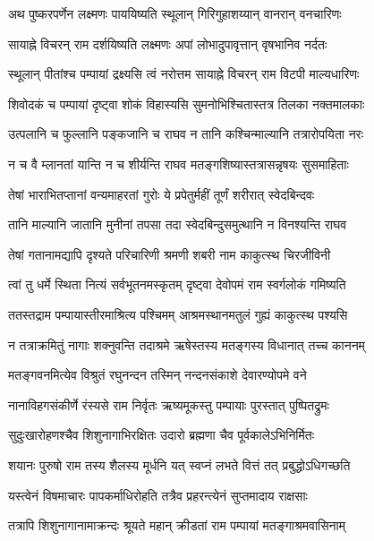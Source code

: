 \twolineshloka
{अथ पुष्करपर्णेन लक्ष्मणः पाययिष्यति}
{स्थूलान् गिरिगुहाशय्यान् वानरान् वनचारिणः} %

\twolineshloka
{सायाह्ने विचरन् राम दर्शयिष्यति लक्ष्मणः}
{अपां लोभादुपावृत्तान् वृषभानिव नर्दतः} %

\twolineshloka
{स्थूलान् पीतांश्च पम्पायां द्रक्ष्यसि त्वं नरोत्तम}
{सायाह्ने विचरन् राम विटपी माल्यधारिणः} %

\twolineshloka
{शिवोदकं च पम्पायां दृष्ट्वा शोकं विहास्यसि}
{सुमनोभिश्चितास्तत्र तिलका नक्तमालकाः} %

\twolineshloka
{उत्पलानि च फुल्लानि पङ्कजानि च राघव}
{न तानि कश्चिन्माल्यानि तत्रारोपयिता नरः} %

\twolineshloka
{न च वै म्लानतां यान्ति न च शीर्यन्ति राघव}
{मतङ्गशिष्यास्तत्रासन्नृषयः सुसमाहिताः} %

\twolineshloka
{तेषां भाराभितप्तानां वन्यमाहरतां गुरोः}
{ये प्रपेतुर्महीं तूर्णं शरीरात् स्वेदबिन्दवः} %

\twolineshloka
{तानि माल्यानि जातानि मुनीनां तपसा तदा}
{स्वेदबिन्दुसमुत्थानि न विनश्यन्ति राघव} %

\twolineshloka
{तेषां गतानामद्यापि दृश्यते परिचारिणी}
{श्रमणी शबरी नाम काकुत्स्थ चिरजीविनी} %

\twolineshloka
{त्वां तु धर्मे स्थिता नित्यं सर्वभूतनमस्कृतम्}
{दृष्ट्वा देवोपमं राम स्वर्गलोकं गमिष्यति} %

\twolineshloka
{ततस्तद्राम पम्पायास्तीरमाश्रित्य पश्चिमम्}
{आश्रमस्थानमतुलं गुह्यं काकुत्स्थ पश्यसि} %

\twolineshloka
{न तत्राक्रमितुं नागाः शक्नुवन्ति तदाश्रमे}
{ऋषेस्तस्य मतङ्गस्य विधानात् तच्च काननम्} %

\twolineshloka
{मतङ्गवनमित्येव विश्रुतं रघुनन्दन}
{तस्मिन् नन्दनसंकाशे देवारण्योपमे वने} %

\twolineshloka
{नानाविहगसंकीर्णे रंस्यसे राम निर्वृतः}
{ऋष्यमूकस्तु पम्पायाः पुरस्तात् पुष्पितद्रुमः} %

\twolineshloka
{सुदुःखारोहणश्चैव शिशुनागाभिरक्षितः}
{उदारो ब्रह्मणा चैव पूर्वकालेऽभिनिर्मितः} %

\twolineshloka
{शयानः पुरुषो राम तस्य शैलस्य मूर्धनि}
{यत् स्वप्नं लभते वित्तं तत् प्रबुद्धोऽधिगच्छति} %

\twolineshloka
{यस्त्वेनं विषमाचारः पापकर्माधिरोहति}
{तत्रैव प्रहरन्त्येनं सुप्तमादाय राक्षसाः} %

\twolineshloka
{तत्रापि शिशुनागानामाक्रन्दः श्रूयते महान्}
{क्रीडतां राम पम्पायां मतङ्गाश्रमवासिनाम्} %

